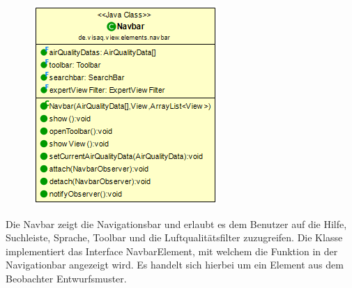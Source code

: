 \begin{minipage}{0.3\textwidth}
    \begin{figure}[H]
        \includegraphics[scale = 0.5]{media/frontend/view/de.view.elements.navbar/NavbarClass.png}
    \end{figure}
    \end{minipage} \hfill
    \begin{minipage}{0.6\textwidth}
Die Navbar zeigt die Navigationsbar und erlaubt es dem Benutzer auf die Hilfe, Suchleiste, Sprache, Toolbar und die Luftqualitätsfilter zuzugreifen.  Die Klasse implementiert das Interface NavbarElement, mit welchem die Funktion in der Navigationbar angezeigt wird.  Es handelt sich hierbei um ein Element aus dem Beobachter Entwurfsmuster.
\end{minipage}


